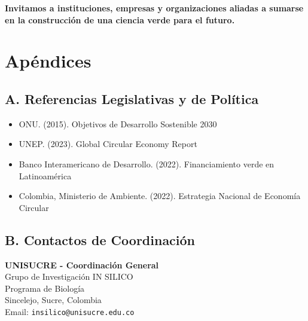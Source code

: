 \documentclass[12pt,a4paper]{article}
\begin{document}
\vspace{1cm}

\textbf{Invitamos a instituciones, empresas y organizaciones aliadas a sumarse en la construcción de una ciencia verde para el futuro.}

\section*{Apéndices}

\subsection*{A. Referencias Legislativas y de Política}

\begin{itemize}
  \item ONU. (2015). Objetivos de Desarrollo Sostenible 2030
  \item UNEP. (2023). Global Circular Economy Report
  \item Banco Interamericano de Desarrollo. (2022). Financiamiento verde en Latinoamérica
  \item Colombia, Ministerio de Ambiente. (2022). Estrategia Nacional de Economía Circular
\end{itemize}

\subsection*{B. Contactos de Coordinación}

\textbf{UNISUCRE - Coordinación General}\\
Grupo de Investigación IN SILICO\\
Programa de Biología\\
Sincelejo, Sucre, Colombia\\
Email: \texttt{insilico@unisucre.edu.co}
\end{document}
